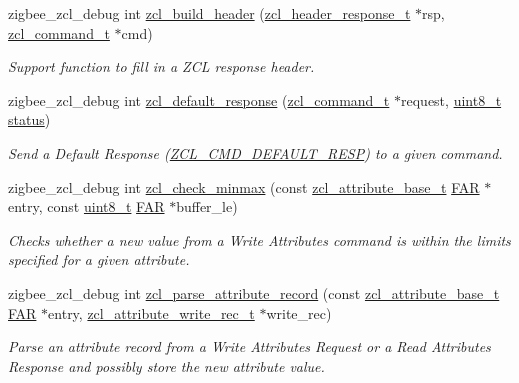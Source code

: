 \begin{DoxyCompactItemize}
zigbee\-\_\-zcl\-\_\-debug int \hyperlink{group__zcl_ga592c970c1f0bda49f1c618d2895dbc6d}{zcl\-\_\-build\-\_\-header} (\hyperlink{group__zcl_gaeac1f6671916dd0ad92b271080ec272a}{zcl\-\_\-header\-\_\-response\-\_\-t} $\ast$rsp, \hyperlink{structzcl__command__t}{zcl\-\_\-command\-\_\-t} $\ast$cmd)
\begin{DoxyCompactList}\small\item\em Support function to fill in a Z\-C\-L response header. \end{DoxyCompactList}\item 
zigbee\-\_\-zcl\-\_\-debug int \hyperlink{group__zcl_gab5c99acba0d864acd326bcab46d1416e}{zcl\-\_\-default\-\_\-response} (\hyperlink{structzcl__command__t}{zcl\-\_\-command\-\_\-t} $\ast$request, \hyperlink{group__hal_gae1affc9ca37cfb624959c866a73f83c2}{uint8\-\_\-t} \hyperlink{group__xbee__atcmd_gade818037fd6c985038ff29656089758d}{status})
\begin{DoxyCompactList}\small\item\em Send a Default Response (\hyperlink{group__zcl_ga92499f538455b8d5a525510fba54adb2}{Z\-C\-L\-\_\-\-C\-M\-D\-\_\-\-D\-E\-F\-A\-U\-L\-T\-\_\-\-R\-E\-S\-P}) to a given command. \end{DoxyCompactList}\item 
zigbee\-\_\-zcl\-\_\-debug int \hyperlink{group__zcl_ga87ee4a8117e0420786a109b1f590ddc5}{zcl\-\_\-check\-\_\-minmax} (const \hyperlink{structzcl__attribute__base__t}{zcl\-\_\-attribute\-\_\-base\-\_\-t} \hyperlink{group__hal_gaef060b3456fdcc093a7210a762d5f2ed}{F\-A\-R} $\ast$entry, const \hyperlink{group__hal_gae1affc9ca37cfb624959c866a73f83c2}{uint8\-\_\-t} \hyperlink{group__hal_gaef060b3456fdcc093a7210a762d5f2ed}{F\-A\-R} $\ast$buffer\-\_\-le)
\begin{DoxyCompactList}\small\item\em Checks whether a new value from a Write Attributes command is within the limits specified for a given attribute. \end{DoxyCompactList}\item 
zigbee\-\_\-zcl\-\_\-debug int \hyperlink{group__zcl_ga9f9ac99001185554fe24dc7b09c0b0b0}{zcl\-\_\-parse\-\_\-attribute\-\_\-record} (const \hyperlink{structzcl__attribute__base__t}{zcl\-\_\-attribute\-\_\-base\-\_\-t} \hyperlink{group__hal_gaef060b3456fdcc093a7210a762d5f2ed}{F\-A\-R} $\ast$entry, \hyperlink{structzcl__attribute__write__rec__t}{zcl\-\_\-attribute\-\_\-write\-\_\-rec\-\_\-t} $\ast$write\-\_\-rec)
\begin{DoxyCompactList}\small\item\em Parse an attribute record from a Write Attributes Request or a Read Attributes Response and possibly store the new attribute value. \end{DoxyCompactList}\item 

\end{DoxyCompactItemize}
